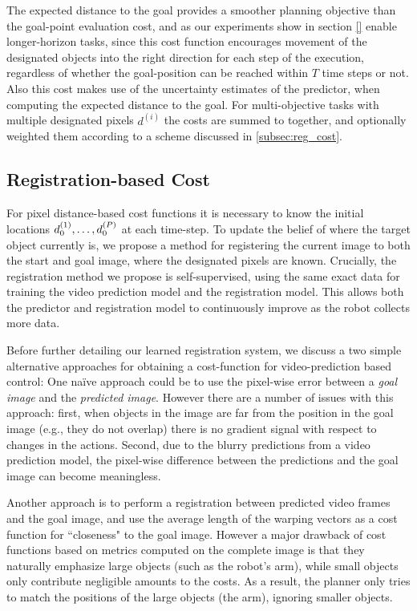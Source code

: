  The expected distance to the goal provides a smoother planning objective than the goal-point evaluation cost, and as our experiments show in section \ref{} enable longer-horizon tasks, since this cost function encourages movement of the designated objects into the right direction for each step of the execution, regardless of whether the goal-position can be reached within $T$ time steps or not. Also this cost makes use of the uncertainty estimates of the predictor, when computing the expected distance to the goal. For multi-objective tasks with multiple designated pixels $d^{(i)}$ the costs are summed to together, and optionally weighted them according to a scheme discussed in \autoref{subsec:reg_cost}.  

\subsection{Registration-based Cost}
\label{subsec:reg_cost}
For pixel distance-based cost functions it is necessary to know the initial locations $d_0^{(1)}, \dots, d_0^{(P)}$ at each time-step. To update the belief of where the target object currently is, we propose a method for registering the current image to both the start and goal image, where the designated pixels are known. Crucially, the registration method we propose is self-supervised, using the same exact data for training the video prediction model and the registration model. This allows both the predictor and registration model to continuously improve as the robot collects more data.

Before further detailing our learned registration system, we discuss a two simple alternative approaches for obtaining a cost-function for video-prediction based control: One na\"{i}ve approach could be to use the pixel-wise error between a \emph{goal image} and the \emph{predicted image}. However there are a number of issues with this approach: first, when objects in the image are far from the position in the goal image (e.g., they do not overlap) there is no gradient signal with respect to changes in the actions. Second, due to the blurry predictions from a video prediction model, the pixel-wise difference between the predictions and the goal image can become meaningless. 

Another approach is to perform a registration between predicted video frames and the goal image, and use the average length of the warping vectors as a cost function for ``closeness" to the goal image. However a major drawback of cost functions based on metrics computed on the complete image is that they naturally emphasize large objects (such as the robot's arm), while small objects only contribute negligible amounts to the costs. As a result, the planner only tries to match the positions of the large objects (the arm), ignoring smaller objects.


